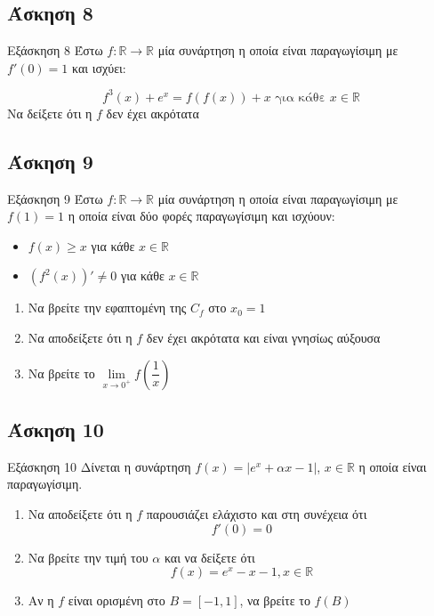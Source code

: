\documentclass[greek]{beamer}
\begin{document}
\subsection{Άσκηση 8}
\begin{frame}[label=Άσκηση8,t]{Εξάσκηση 8}
  Έστω $f:\mathbb{R}\to\mathbb{R}$ μία συνάρτηση η οποία είναι παραγωγίσιμη με $f'(0)=1$ και ισχύει:

  $$f^3(x)+e^x=f(f(x))+x \text{ για κάθε } x\in\mathbb{R}$$
  Να δείξετε ότι η $f$ δεν έχει ακρότατα

\end{frame}

\subsection{Άσκηση 9}
\begin{frame}[label=Άσκηση9,t]{Εξάσκηση 9}
  Έστω $f:\mathbb{R}\to\mathbb{R}$ μία συνάρτηση η οποία είναι παραγωγίσιμη με $f(1)=1$ η οποία είναι δύο φορές παραγωγίσιμη και ισχύουν:
  \begin{itemize}
    \item $f(x)\ge x$ για κάθε $x\in\mathbb{R}$
    \item $\left( f^2(x) \right)'\ne 0$ για κάθε $x\in\mathbb{R}$
  \end{itemize}

  \begin{enumerate}
    \item<1-> Να βρείτε την εφαπτομένη της $C_f$ στο $x_0=1$
    \item<2-> Να αποδείξετε ότι η $f$ δεν έχει ακρότατα και είναι γνησίως αύξουσα
    \item<3-> Να βρείτε το $\lim\limits_{x \to 0^+}{ f\left( \dfrac{1}{x} \right) }$
  \end{enumerate}

\end{frame}

\subsection{Άσκηση 10}
\begin{frame}[label=Άσκηση10,t]{Εξάσκηση 10}
  Δίνεται η συνάρτηση $f(x)=|e^x+αx-1|$, $x\in\mathbb{R}$ η οποία είναι παραγωγίσιμη.
  \begin{enumerate}
    \item<1-> Να αποδείξετε ότι η $f$ παρουσιάζει ελάχιστο και στη συνέχεια ότι
      $$f'(0)=0$$
    \item<2-> Να βρείτε την τιμή του $α$ και να δείξετε ότι
      $$f(x)=e^x-x-1,x\in\mathbb{R}$$
    \item<3-> Αν η $f$ είναι ορισμένη στο $Β=[-1,1]$, να βρείτε το $f(Β)$
  \end{enumerate}

\end{frame}
\end{document}
